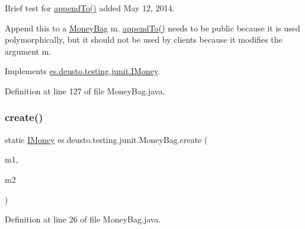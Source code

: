 Brief test for \hyperlink{classes_1_1deusto_1_1testing_1_1junit_1_1_money_bag_ac8a5877b35b12939ce14543872ed18af}{append\+To()} added May 12, 2014. 

Append this to a \hyperlink{classes_1_1deusto_1_1testing_1_1junit_1_1_money_bag}{Money\+Bag} m. \hyperlink{classes_1_1deusto_1_1testing_1_1junit_1_1_money_bag_ac8a5877b35b12939ce14543872ed18af}{append\+To()} needs to be public because it is used polymorphically, but it should not be used by clients because it modifies the argument m. 

Implements \hyperlink{interfacees_1_1deusto_1_1testing_1_1junit_1_1_i_money_ae45bc758e69a0017f083f11d050c53cb}{es.\+deusto.\+testing.\+junit.\+I\+Money}.



Definition at line 127 of file Money\+Bag.\+java.

\mbox{\label{classes_1_1deusto_1_1testing_1_1junit_1_1_money_bag_a8d2d54a342d2de2b75530600123efc9a}} 
\subsubsection{\texorpdfstring{create()}{create()}}
{\footnotesize\ttfamily static \hyperlink{interfacees_1_1deusto_1_1testing_1_1junit_1_1_i_money}{I\+Money} es.\+deusto.\+testing.\+junit.\+Money\+Bag.\+create (\begin{DoxyParamCaption}\item[{\hyperlink{interfacees_1_1deusto_1_1testing_1_1junit_1_1_i_money}{I\+Money}}]{m1,  }\item[{\hyperlink{interfacees_1_1deusto_1_1testing_1_1junit_1_1_i_money}{I\+Money}}]{m2 }\end{DoxyParamCaption})\hspace{0.3cm}{\ttfamily [static]}}



Definition at line 26 of file Money\+Bag.\+java.

\mbox{\label{classes_1_1deusto_1_1testing_1_1junit_1_1_money_bag_a80926d10c9619bd2ad84eabe52ca03bb}} 
